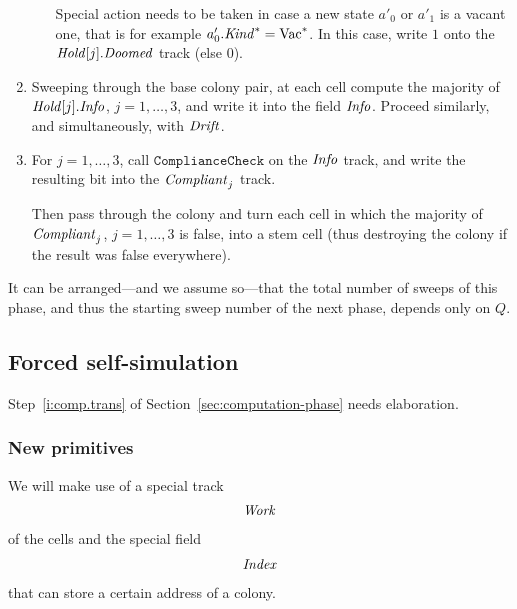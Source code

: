 \documentclass[11pt]{memoir}
\theoremstyle{definition} %
\newcommand{\fld}[1]{\ensuremath{\textit{#1\/}}}
\newcommand{\rul}[1]{\ensuremath{\texttt{#1}}}
\newcommand{\Vacant}{\mathrm{Vac}}
\newcommand{\Q}{Q}
\newcommand{\Drift}{\fld{Drift}}
\newcommand{\Doomed}{\fld{Doomed}}
\newcommand{\Hold}{\fld{Hold}}
\newcommand{\Index}{\fld{Index}}
\newcommand{\Info}{\fld{Info}}
\newcommand{\Kind}{\fld{Kind}}
\newcommand{\Work}{\fld{Work}}
\begin{document}
\begin{enumerate}
\begin{enumerate}
              Special action needs to be taken in case 
              a new state \( a'_{0} \) or \( a'_{1} \) is a vacant one, that is for example
              \( a'_{0}.\Kind^{*}=\Vacant^{*} \).
              In this case, write \( 1 \) onto the \( \Hold[j].\Doomed \) track (else 0).

        \end{enumerate}

       \item
            Sweeping through the base colony pair,
            at each cell compute the majority of \( \Hold[j].\Info \), \( j=1,\dots,3 \),
            and write it into the field \( \Info \).
            Proceed similarly, and simultaneously, with \( \Drift \).

       \item       For \( j=1,\dots,3 \), call \( \rul{ComplianceCheck} \) on the \( \Info \) track, and
write the resulting bit into the \( \fld{Compliant}_{j} \) track.

Then pass through the colony and turn each cell in which the majority 
of \( \fld{Compliant}_{j} \), \( j=1,\dots,3 \) is false, into a stem cell
(thus destroying the colony if the result was false everywhere).

  \end{enumerate}

It can be arranged---and we assume so---that the total number of sweeps of this
phase, and thus the starting sweep number of the next phase, depends only on \( \Q \).

\subsection{Forced self-simulation}\label{sec:self-simulation}

Step~\ref{i:comp.trans} of Section~\ref{sec:computation-phase} needs elaboration.

\subsubsection{New primitives}

We will make use of a special track
\begin{align*}
   \Work
 \end{align*}
of the cells and the special field
\begin{align*}
   \Index
 \end{align*}
that can store a certain address of a colony.
\end{document}
